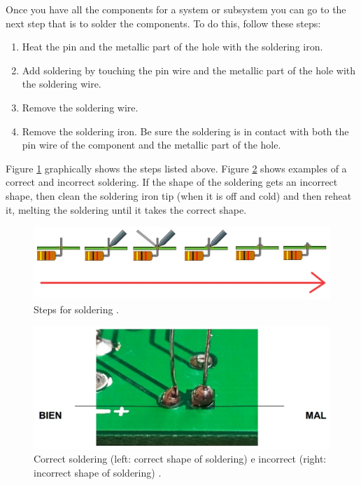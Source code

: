 \documentclass[12pt,letterpaper]{article}
\numberwithin{figure}{section}
\numberwithin{equation}{section}
\numberwithin{table}{section}
\begin{document}
Once you have all the components for a system or subsystem you can go to the next step that is to solder the components. To do this, follow these steps:

\begin{enumerate}
    \item Heat the pin and the metallic part of the hole with the soldering iron.
    \item Add soldering by touching the pin wire and the metallic part of the hole with the soldering wire.
    \item Remove the soldering wire.
    \item Remove the soldering iron. Be sure the soldering is in contact with both the pin wire of the component and the metallic part of the hole. 
\end{enumerate}

Figure \ref{fig:31} graphically shows the steps listed above. Figure \ref{fig:32} shows examples of a correct and incorrect soldering. If the shape of the soldering gets an incorrect shape, then clean the soldering iron tip (when it is off and cold) and then reheat it, melting the soldering until it takes the correct shape.

\begin{figure}[H]
    \centering
    \includegraphics[scale=0.5]{Figuras/figure_31.jpg}
    \caption{Steps for soldering \cite{Armaduino}.}
    \label{fig:31}
\end{figure}

\begin{figure}[H]
    \centering
    \includegraphics[scale=0.5]{Figuras/figure_32.jpg}
    \caption{Correct soldering (left: correct shape of soldering) e incorrect (right: incorrect shape of soldering) \cite{Armaduino}.}
    \label{fig:32}
\end{figure}
\end{document}
